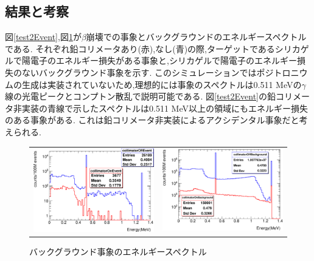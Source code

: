 \subsection{結果と考察}

図\ref{test2Event},図\ref{test2Back}が$\beta$崩壊での事象とバックグラウンドのエネルギースペクトルである.
それぞれ鉛コリメータあり(赤),なし(青)の際,ターゲットであるシリカゲルで陽電子のエネルギー損失がある事象と,シリカゲルで陽電子のエネルギー損失のないバックグラウンド事象を示す.
このシミュレーションではポジトロニウムの生成は実装されていないため,理想的には事象のスペクトルは0.511 MeVの$\gamma$線の光電ピークとコンプトン散乱で説明可能である.
図\ref{test2Event}の鉛コリメータ非実装の青線で示したスペクトルは0.511 MeV以上の領域にもエネルギー損失のある事象がある.
これは鉛コリメータ非実装によるアクシデンタル事象だと考えられる.

\begin{figure}[htbp]
	\begin{tabular}{cc}
	\centering
		\begin{minipage}{0.5\hsize}
		\includegraphics[width=7cm]{fig/test2Event.pdf}
			\caption{鉛コリメータの有無で期待される事象のエネルギースペクトル}
	\label{test2Event}
		\end{minipage}&

		\begin{minipage}{0.5\hsize}
	\centering
		\includegraphics[width=7cm]{fig/test2Back.pdf}
			\caption{バックグラウンド事象のエネルギースペクトル}
	\label{test2Back}
		\end{minipage}
		\end{tabular}
\end{figure}

